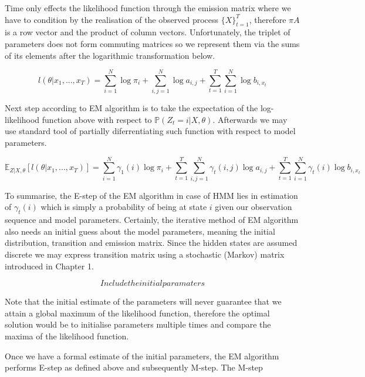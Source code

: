 Time only effects the likelihood function through the emission matrix where we have to condition by the realisation of the observed process $\{X\}_{t=1}^T$, therefore $\pi A$ is a row vector and the product of column vectors. Unfortunately, the triplet of parameters does not form commuting matrices so we represent them via the sums of its elements after the logarithmic transformation below.

\begin{equation}
l(\theta|x_1,...,x_T) = \sum_{i=1}^{N}  \log \pi_i + \sum_{i,j=1}^{N} \log a_{i,j}+ \sum_{t=1}^{T} \sum_{i=1}^{N} \log b_{i,x_t}
\end{equation}

Next step according to EM algorithm is to take the expectation of the log-likelihood function above with respect to $\mathbb{P}(Z_t=i|X,\theta)$. Afterwards we may use standard tool of partially diferrentiating such function with respect to model parameters.

\begin{equation}
\mathbb{E}_{Z|X,\theta} [l(\theta|x_1,...,x_T)] = \sum_{i=1}^{N} \gamma_1(i) \log \pi_i + \sum_{t=1}^{T} \sum_{i,j=1}^{N} \gamma_t (i,j) \log a_{i,j}+ \sum_{t=1}^{T} \sum_{i=1}^{N} \gamma_t (i) \log b_{i,x_t}
\end{equation}

To summarise, the E-step of the EM algorithm in case of HMM lies in estimation of $\gamma_t(i)$ which is simply a probability of being at state $i$ given our observation sequence and model parameters. Certainly, the iterative method of EM algorithm also needs an initial guess about the model parameters, meaning the initial distribution, transition and emission matrix. Since the hidden states are assumed discrete we may express transition matrix using a stochastic (Markov) matrix introduced in Chapter 1. 

\[Include the initial paramaters\]

Note that the initial estimate of the parameters will never guarantee that we attain a global maximum of the likelihood function, therefore the optimal solution would be to initialise parameters multiple times and compare the maxima of the likelihood function. 

Once we have a formal estimate of the initial parameters, the EM algorithm performs E-step as defined above and subsequently M-step. The M-step




 






